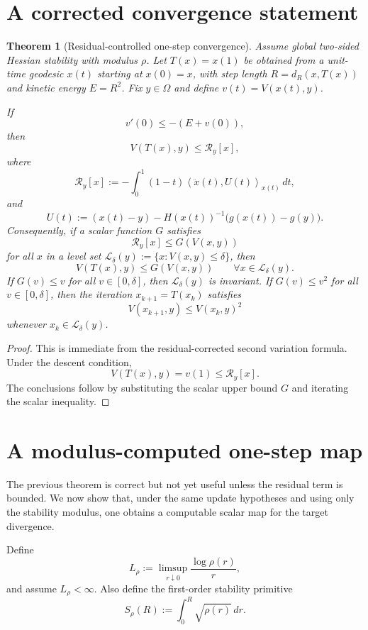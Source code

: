 \documentclass[11pt]{article}
\newtheorem{theorem}{Theorem}
\newcommand{\ip}[2]{\left\langle #1,#2\right\rangle}
\begin{document}
\section{A corrected convergence statement}

\begin{theorem}[Residual-controlled one-step convergence]
Assume global two-sided Hessian stability with modulus $\rho$. Let $T(x)=x(1)$ be obtained from a unit-time geodesic $x(t)$ starting at $x(0)=x$, with step length $R=d_R(x,T(x))$ and kinetic energy $E=R^2$. Fix $y\in\Omega$ and define $v(t)=V(x(t),y)$.

If
\[
    v'(0)\le -(E+v(0)),
\]
then
\[
    V(T(x),y)\le \mathcal R_y[x],
\]
where
\[
    \mathcal R_y[x]
    :=
    -\int_0^1 (1-t)\ip{\ddot x(t)}{U(t)}_{x(t)}\,dt,
\]
and
\[
    U(t)
    :=
    (x(t)-y)-H(x(t))^{-1}\bigl(g(x(t))-g(y)\bigr).
\]
Consequently, if a scalar function $G$ satisfies
\[
    \mathcal R_y[x]\le G(V(x,y))
\]
for all $x$ in a level set $\mathcal L_\delta(y):=\{x:V(x,y)\le\delta\}$, then
\[
    V(T(x),y)\le G(V(x,y))
    \qquad
    \forall x\in\mathcal L_\delta(y).
\]
If $G(v)\le v$ for all $v\in[0,\delta]$, then $\mathcal L_\delta(y)$ is invariant. If $G(v)\le v^2$ for all $v\in[0,\delta]$, then the iteration $x_{k+1}=T(x_k)$ satisfies
\[
    V(x_{k+1},y)\le V(x_k,y)^2
\]
whenever $x_k\in\mathcal L_\delta(y)$.
\end{theorem}

\begin{proof}
This is immediate from the residual-corrected second variation formula. Under the descent condition,
\[
    V(T(x),y)=v(1)
    \le
    \mathcal R_y[x].
\]
The conclusions follow by substituting the scalar upper bound $G$ and iterating the scalar inequality.
\end{proof}




\section{A modulus-computed one-step map}

The previous theorem is correct but not yet useful unless the residual term is bounded.
We now show that, under the same update hypotheses and using only the stability modulus,
one obtains a computable scalar map for the target divergence.

Define
\[
    L_\rho
    :=
    \limsup_{r\downarrow0}\frac{\log \rho(r)}{r},
\]
and assume $L_\rho<\infty$.  Also define the first-order stability primitive
\[
    S_\rho(R)
    :=
    \int_0^R \sqrt{\rho(r)}\,dr.
\]
\end{document}
